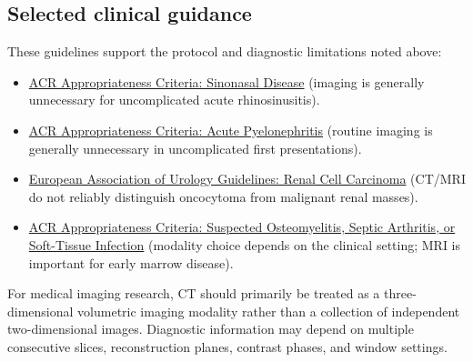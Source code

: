 \subsection{Selected clinical guidance}
These guidelines support the protocol and diagnostic limitations noted above:
\begin{itemize}
\item \href{https://acsearch.acr.org/docs/69502/Narrative/}{ACR Appropriateness Criteria: Sinonasal Disease} (imaging is generally unnecessary for uncomplicated acute rhinosinusitis).
\item \href{https://acsearch.acr.org/docs/69489/Narrative}{ACR Appropriateness Criteria: Acute Pyelonephritis} (routine imaging is generally unnecessary in uncomplicated first presentations).
\item \href{https://uroweb.org/guidelines/renal-cell-carcinoma/chapter/diagnostic-evaluation}{European Association of Urology Guidelines: Renal Cell Carcinoma} (CT/MRI do not reliably distinguish oncocytoma from malignant renal masses).
\item \href{https://acsearch.acr.org/docs/3094201/Narrative}{ACR Appropriateness Criteria: Suspected Osteomyelitis, Septic Arthritis, or Soft-Tissue Infection} (modality choice depends on the clinical setting; MRI is important for early marrow disease).
\end{itemize}

For medical imaging research, CT should primarily be treated as a three-dimensional volumetric imaging modality rather than a collection of independent two-dimensional images. Diagnostic information may depend on multiple consecutive slices, reconstruction planes, contrast phases, and window settings.

